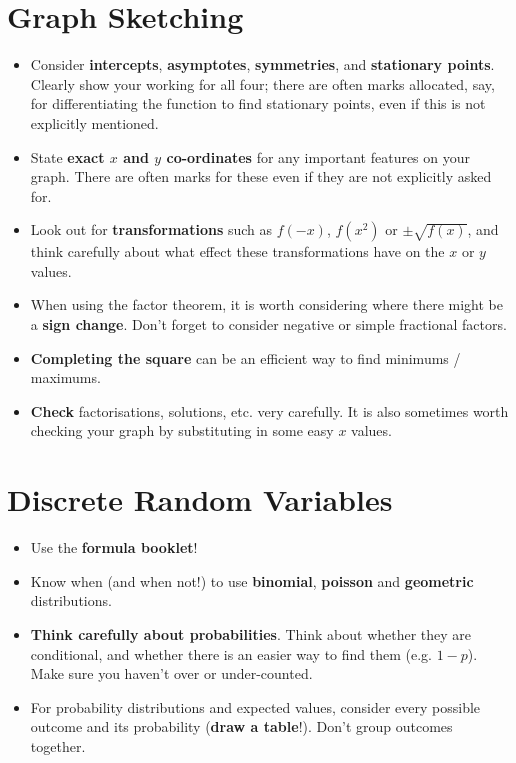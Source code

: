 \documentclass[9pt]{extarticle}
\begin{document}
	\section{Graph Sketching}
	
	\begin{itemize}
		\item Consider \textbf{intercepts}, \textbf{asymptotes}, \textbf{symmetries}, and \textbf{stationary points}. Clearly show your working for all four; there are often marks allocated, say, for differentiating the function to find stationary points, even if this is not explicitly mentioned.
		\item State \textbf{exact $x$ and $y$ co-ordinates} for any important features on your graph. There are often marks for these even if they are not explicitly asked for.
		\item Look out for \textbf{transformations} such as $f(-x)$, $f(x^2)$ or $\pm\sqrt{f(x)}$, and think carefully about what effect these transformations have on the $x$ or $y$ values.
		\item When using the factor theorem, it is worth considering where there might be a \textbf{sign change}. Don't forget to consider negative or simple fractional factors.
		\item \textbf{Completing the square} can be an efficient way to find minimums / maximums.
		\item \textbf{Check} factorisations, solutions, etc. very carefully. It is also sometimes worth checking your graph by substituting in some easy $x$ values.
	\end{itemize}
	
	\section{Discrete Random Variables}
	
	\begin{itemize}
		\item Use the \textbf{formula booklet}!
		\item Know when (and when not!) to use \textbf{binomial}, \textbf{poisson} and \textbf{geometric} distributions.
		\item \textbf{Think carefully about probabilities}. Think about whether they are conditional, and whether there is an easier way to find them (e.g. $1-p$). Make sure you haven't over or under-counted.
		\item For probability distributions and expected values, consider every possible outcome and its probability (\textbf{draw a table}!). Don't group outcomes together.
	\end{itemize}
	
\end{document}

